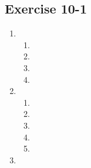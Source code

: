\subsection{Exercise 10-1} %
  \begin{enumerate}[itemsep=5pt, label=\textbf{\arabic*}. ]
  \item %
    \begin{enumerate}[noitemsep, label=\textbf{(\alph*)} ]
    \item %
    \item %
    \item %
    \item %
    \end{enumerate}
  \item %
    \begin{enumerate}[noitemsep, label=\textbf{(\alph*)} ]
    \item %
    \item %
    \item %
    \item %
    \item %
    \end{enumerate}
\item %

\end{enumerate}
